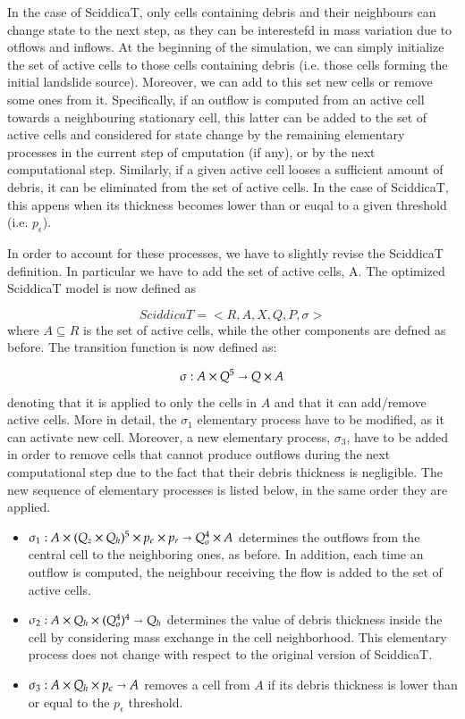 In the case of SciddicaT, only cells containing debris and their
neighbours can change state to the next step, as they can be
interestefd in mass variation due to otflows and inflows. At the
beginning of the simulation, we can simply initialize the set of
active cells to those cells containing debris (i.e. those cells
forming the initial landslide source). Moreover, we can add to this
set new cells or remove some ones from it. Specifically, if an outflow
is computed from an active cell towards a neighbouring stationary
cell, this latter can be added to the set of active cells and
considered for state change by the remaining elementary processes in
the current step of cmputation (if any), or by the next computational
step. Similarly, if a given active cell looses a sufficient amount of
debris, it can be eliminated from the set of active cells. In the case
of SciddicaT, this appens when its thickness becomes lower than or
euqal to a given threshold (i.e. $p_\epsilon$).

In order to account for these processes, we have to slightly revise
the SciddicaT definition. In particular we have to add the set of
active cells, A. The optimized SciddicaT model is now defined as

$$SciddicaT = < R, A, X, Q , P, \sigma >$$
where $A \subseteq R$ is the set of active cells, while the other
components are defned as before. The transition function is now defined as:

$$\sigma : A \times Q^5 \shortrightarrow Q \times A$$ denoting that it
is applied to only the cells in $A$ and that it can add/remove active
cells. More in detail, the $\sigma_1$ elementary process have to
be modified, as it can activate new cell. Moreover, a new elementary
process, $\sigma_3$, have to be added in order to remove cells that
cannot produce outflows during the next computational step due to the
fact that their debris thickness is negligible. The new sequence of
elementary processes is listed below, in the same order they are
applied.

\begin{itemize}
\item $\sigma_1 : A \times (Q_z \times Q_h)^5 \times p_\epsilon \times p_r
  \shortrightarrow Q_o^4 \times A$ determines the outflows from the
  central cell to the neighboring ones, as before. In addition, each
  time an outflow is computed, the neighbour receiving the flow is
  added to the set of active cells.

\item $\sigma_2: A \times Q_h \times (Q_o^4)^4 \shortrightarrow Q_h$ determines
  the value of debris thickness inside the cell by considering mass
  exchange in the cell neighborhood. This elementary process does not
  change with respect to the original version of SciddicaT.

\item $\sigma_3: A \times Q_h \times p_\epsilon \shortrightarrow A$
  removes a cell from $A$ if its debris thickness is lower than or
  equal to the $p_\epsilon$ threshold.
\end{itemize}

